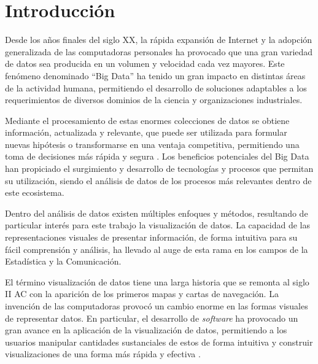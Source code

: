 \chapter*{Introducción}\label{chapter:introduction}

Desde los a\~nos finales del siglo XX, la
r\'apida expansi\'on de Internet y la adopci\'on generalizada de las
computadoras personales ha provocado que una gran variedad de datos sea
producida en un volumen y velocidad cada vez mayores. Este fen\'omeno
denominado ``Big Data'' \cite{beyer2012importance} ha tenido un gran impacto en distintas \'areas de
la actividad humana, permitiendo el desarrollo de soluciones adaptables a los
requerimientos de diversos dominios de la ciencia y organizaciones industriales.

Mediante el procesamiento de estas enormes colecciones de datos se
obtiene informaci\'on, actualizada y relevante, que puede ser utilizada para
formular nuevas hip\'otesis o transformarse en una ventaja competitiva, permitiendo
una toma de decisiones m\'as r\'apida y segura \cite{de2016formal}. Los beneficios
potenciales del Big Data han propiciado el surgimiento y desarrollo de tecnolog\'ias
y procesos que permitan su utilizaci\'on, siendo el an\'alisis de datos de los procesos
m\'as relevantes dentro de este ecosistema.

Dentro del an\'alisis de datos existen m\'ultiples enfoques y m\'etodos, resultando
de particular inter\'es para este trabajo la visualizaci\'on de datos. La capacidad
de las representaciones visuales de presentar informaci\'on, de forma intuitiva para su
f\'acil comprensi\'on y an\'alisis, ha llevado al auge de esta rama en los campos
de la Estad\'istica y la Comunicaci\'on.

El t\'ermino visualizaci\'on de datos tiene una larga historia que se remonta al
siglo II AC con la aparici\'on de los primeros mapas y cartas de navegaci\'on. La invenci\'on de las computadoras provoc\'o un cambio enorme
en las formas visuales de representar datos. En particular, el desarrollo de \textit{software} ha provocado
un gran avance en la aplicaci\'on de la visualizaci\'on de datos, permitiendo a los usuarios
manipular cantidades sustanciales de estos de forma intuitiva y construir
visualizaciones de una forma m\'as r\'apida y efectiva \cite{li2020overview}. 


